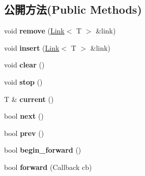 \subsection*{公開方法(Public Methods)}
\begin{DoxyCompactItemize}
\item 
void {\bfseries remove} (\hyperlink{class_magnum_1_1_link}{Link}$<$ T $>$ \&link)\hypertarget{class_magnum_1_1_post_a068492bb1e084836ea956c92ed496cd0}{}\label{class_magnum_1_1_post_a068492bb1e084836ea956c92ed496cd0}

\item 
void {\bfseries insert} (\hyperlink{class_magnum_1_1_link}{Link}$<$ T $>$ \&link)\hypertarget{class_magnum_1_1_post_aa7e5aeeac62fd1e7c88174bb9f6b7a49}{}\label{class_magnum_1_1_post_aa7e5aeeac62fd1e7c88174bb9f6b7a49}

\item 
void {\bfseries clear} ()\hypertarget{class_magnum_1_1_post_a7c65e7cb2f457018628e40245eb791d6}{}\label{class_magnum_1_1_post_a7c65e7cb2f457018628e40245eb791d6}

\item 
void {\bfseries stop} ()\hypertarget{class_magnum_1_1_post_accb6e1cfa16cae56e13bfb6ea99679cf}{}\label{class_magnum_1_1_post_accb6e1cfa16cae56e13bfb6ea99679cf}

\item 
T \& {\bfseries current} ()\hypertarget{class_magnum_1_1_post_a544e544d8524be7d8209bca0aa6867a5}{}\label{class_magnum_1_1_post_a544e544d8524be7d8209bca0aa6867a5}

\item 
bool {\bfseries next} ()\hypertarget{class_magnum_1_1_post_a22572ac0b4d081531717e60c6eb2420c}{}\label{class_magnum_1_1_post_a22572ac0b4d081531717e60c6eb2420c}

\item 
bool {\bfseries prev} ()\hypertarget{class_magnum_1_1_post_a97599f70b4bf276b3e60d411ffcfa07c}{}\label{class_magnum_1_1_post_a97599f70b4bf276b3e60d411ffcfa07c}

\item 
bool {\bfseries begin\+\_\+forward} ()\hypertarget{class_magnum_1_1_post_a0c2b37e4d01f323bdfb5794e803f9dc8}{}\label{class_magnum_1_1_post_a0c2b37e4d01f323bdfb5794e803f9dc8}

\item 
bool {\bfseries forward} (Callback cb)\hypertarget{class_magnum_1_1_post_abb9076aa872fb875c77a3023c4728e4c}{}\label{class_magnum_1_1_post_abb9076aa872fb875c77a3023c4728e4c}


\end{DoxyCompactItemize}
